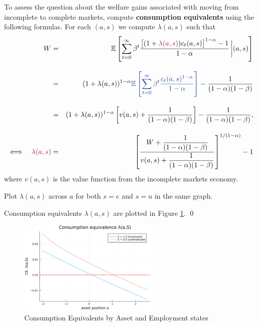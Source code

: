 
\par \noindent To assess the question about the welfare gains associated with moving
from incomplete to complete markets, compute \textbf{\color{red} consumption equivalents} using
the following formulas. For each $(a,s)$ we compute $\lambda(a,s)$ such that
\begin{eqnarray}
    W &= &\E\left[ \sum_{t=0}^\infty \beta^t
    \frac{\big[(1+ {\color{red} \lambda(a,s) })c_t(a,s)\big]^{1-\alpha}-1}{1-\alpha}
    \,\bigg| (a,s)\right] \\[1em]
    &= &(1+\lambda(a,s))^{1-\alpha}
        {\color{blue} \E\left[ \sum_{t=0}^\infty \beta^t
                \frac{c_t(a,s)^{1-\alpha}}{1-\alpha}\right]}
    - \frac{1}{(1-\alpha)(1-\beta)} \\[1em]
    &=& (1+\lambda(a,s))^{1-\alpha}
    \left[ v(a,s) + \frac{1}{(1-\alpha)(1-\beta)} \right]
    - \frac{1}{(1-\alpha)(1-\beta)}, \\[1em]
    \Longleftrightarrow \quad {\color{red} \lambda(a,s) } & = & \left[
        \frac{ W + \dfrac{1}{(1-\alpha)(1-\beta)} }
        { v(a,s) + \dfrac{1}{(1-\alpha)(1-\beta)} }
        \right]^{1/(1-\alpha)} - 1
\end{eqnarray} where $ v(a,s)$ is the value function from the incomplete markets economy.

\begin{framedexercise}
    Plot $\lambda(a,s)$ across $a$ for both $s= e$ and $s= u$ in the same graph.
\end{framedexercise}

\begin{solution} Consumption equivalents $\lambda(a,s)$ are plotted in Figure \ref{fig:CE}. \qed
    \begin{figure}[H]
        \centering
        \includegraphics[width=0.6\textwidth, angle=0]
        {5 Consumption_Equivalence.png}
        \caption{Consumption Equivalents by Asset and Employment states}
        \label{fig:CE}
    \end{figure}
\end{solution}

